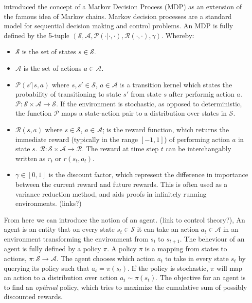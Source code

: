 \documentclass{../main.tex}{subfiles}
\begin{document}
\cite{Bellman1957} introduced the concept of a Markov Decision Process (MDP) as an extension of the famous idea of Markov chains. Markov decision processes are a standard model for sequential decision making and control problems. An MDP is fully defined by the 5-tuple $(\mathcal{S}, \mathcal{A}, \mathcal{P(\cdot | \cdot, \cdot)}, \mathcal{R(\cdot, \cdot)}, \gamma)$. Whereby:

\begin{itemize}
\item $\mathcal{S}$ is the set of states $s \in \mathcal{S}$.
\item $\mathcal{A}$ is the set of actions $a \in \mathcal{A}$.
\item $\mathcal{P}(s' | s, a)$ where $s, s' \in \mathcal{S}$, $a \in \mathcal{A}$ is a transition kernel which states the probability of transitioning to state $s'$ from state $s$ after performig action $a$. $\mathcal{P}: \mathcal{S} \times \mathcal{A} \to \mathcal{S}$. If the environment is stochastic, as opposed to deterministic, the function $\mathcal{P}$ maps a state-action pair to a distribution over states in $\mathcal{S}$. 
\item $\mathcal{R}(s, a)$ where $s \in \mathcal{S}$, $a \in \mathcal{A}$; is the reward function, which returns the immediate reward (typically in the range $[-1,1]$) of performing action $a$ in state $s$. $\mathcal{R}: \mathcal{S} \times \mathcal{A} \to \mathbb{\mathcal{R}}$. The reward at time step $t$ can be interchangably written as $r_t$ or $r(s_t, a_t)$.
\item $\gamma \in [0,1]$ is the discount factor, which represent the difference in importance between the current reward and future rewards. This is often used as a variance reduction method,  and aids proofs in infinitely running environments. (links?)
\end{itemize}

From here we can introduce the notion of an agent. (link to control theory?), An agent is an entity that on every state $s_t \in \mathcal{S}$ it can take an action $a_t \in \mathcal{A}$ in an environment transforming the environment from $s_t$ to $s_{t+1}$. The beheviour of an agent is fully defined by a policy $\pi$. A policy $\pi$ is a mapping from states to actions, $\pi: \mathcal{S} \to \mathcal{A}$. The agent chooses which action $a_t$ to take in every state $s_t$ by querying its policy such that $a_t = \pi(s_t)$. If the policy is stochastic, $\pi$ will map an action to a distribution over action $a_t \sim \pi(s_t)$. The objective for an agent is to find an \textit{optimal} policy, which tries to maximize the cumulative sum of possibly discounted rewards.
\end{document}
